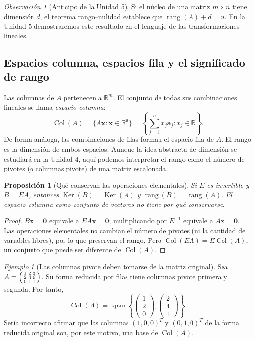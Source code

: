 \documentclass[12pt]{article}
\newtheorem{proposicion}[definicion]{Proposición}
\theoremstyle{remark}
\newtheorem{observacion}[definicion]{Observación}
\newtheorem{ejemplo}[definicion]{Ejemplo}
\newcommand{\R}{\mathbb{R}}
\newcommand{\rang}{\operatorname{rang}}
\newcommand{\Ker}{\operatorname{Ker}}
\newcommand{\vect}[1]{\boldsymbol{#1}}
\begin{document}
\begin{observacion}[Anticipo de la Unidad 5]
Si el núcleo de una matriz $m\times n$ tiene dimensión $d$, el teorema rango--nulidad establece que $\rang(A)+d=n$. En la Unidad 5 demostraremos este resultado en el lenguaje de las transformaciones lineales.
\end{observacion}

\subsection{Espacios columna, espacios fila y el significado de rango}
Las columnas de $A$ pertenecen a $\R^m$. El conjunto de todas sus combinaciones lineales se llama \emph{espacio columna}:
\[
\operatorname{Col}(A)=\{A\vect x:\vect x\in\R^n\}
=\left\{\sum_{j=1}^{n}x_j\vect a_j:x_j\in\R\right\}.
\]
De forma análoga, las combinaciones de filas forman el espacio fila de $A$. El rango es la dimensión de ambos espacios. Aunque la idea abstracta de dimensión se estudiará en la Unidad 4, aquí podemos interpretar el rango como el número de pivotes (o columnas pivote) de una matriz escalonada.

\begin{proposicion}[Qué conservan las operaciones elementales]
Si $E$ es invertible y $B=EA$, entonces $\Ker(B)=\Ker(A)$ y $\rang(B)=\rang(A)$. El espacio columna \emph{como conjunto de vectores} no tiene por qué conservarse.
\end{proposicion}
\begin{proof}
$B\vect x=\vect0$ equivale a $EA\vect x=\vect0$; multiplicando por $E^{-1}$ equivale a $A\vect x=\vect0$. Las operaciones elementales no cambian el número de pivotes (ni la cantidad de variables libres), por lo que preservan el rango. Pero $\operatorname{Col}(EA)=E\operatorname{Col}(A)$, un conjunto que puede ser diferente de $\operatorname{Col}(A)$.
\end{proof}
\begin{ejemplo}[Las columnas pivote deben tomarse de la matriz original]
Sea $A=\begin{psmallmatrix}1&2&3\\2&4&6\\0&1&1\end{psmallmatrix}$. Su forma reducida por filas tiene columnas pivote primera y segunda. Por tanto,
\[
\operatorname{Col}(A)=\operatorname{span}\left\{\begin{pmatrix}1\\2\\0\end{pmatrix},\begin{pmatrix}2\\4\\1\end{pmatrix}\right\}.
\]
Sería incorrecto afirmar que las columnas $(1,0,0)^T$ y $(0,1,0)^T$ de la forma reducida original son, por este motivo, una base de $\operatorname{Col}(A)$.
\end{ejemplo}
\end{document}
